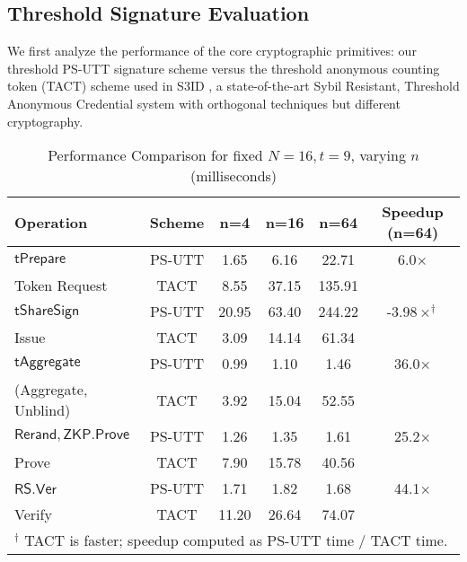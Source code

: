 \subsection{Threshold Signature Evaluation}
We first analyze the performance of the core cryptographic primitives: our threshold PS-UTT signature scheme versus the threshold anonymous counting token (TACT) scheme used in S3ID \cite{rabaninejad_attribute-based_2024}, a state-of-the-art Sybil Resistant, Threshold Anonymous Credential system with orthogonal techniques but different cryptography.

\begin{table}[!htbp]
\centering
\caption[Threshold ABC Performance Comparison, fixed number of nodes, varying attribute length]{Performance Comparison for fixed $ N = 16, t = 9 $, varying $n$ (milliseconds)}
\begin{tabular}{lccccc}
\toprule
\textbf{Operation} & \textbf{Scheme} & \textbf{n=4} & \textbf{n=16} & \textbf{n=64} & \textbf{Speedup (n=64)} \\
\midrule
$\mathsf{tPrepare}$ & PS-UTT & 1.65 & 6.16 & 22.71 & 6.0$\times$ \\
Token Request       & TACT   & 8.55 & 37.15 & 135.91 & \\
\midrule
$\mathsf{tShareSign}$      & PS-UTT & 20.95 & 63.40 & 244.22 & -3.98$\times^\dagger$ \\
Issue             & TACT   & 3.09 & 14.14 & 61.34 & \\
\midrule
$\mathsf{tAggregate}$ & PS-UTT & 0.99 & 1.10 & 1.46 & 36.0$\times$ \\
(Aggregate, Unblind)                     & TACT   & 3.92 & 15.04 & 52.55 & \\
\midrule
$\mathsf{Rerand, ZKP.Prove}$         & PS-UTT & 1.26 & 1.35 & 1.61 & 25.2$\times$ \\
Prove             & TACT   & 7.90 & 15.78 & 40.56 & \\
\midrule
$\mathsf{RS.Ver}$         & PS-UTT & 1.71 & 1.82 & 1.68 & 44.1$\times$ \\
Verify             & TACT   & 11.20 & 26.64 & 74.07 & \\
\bottomrule
\multicolumn{6}{l}{\small $^\dagger$ TACT is faster; speedup computed as PS-UTT time / TACT time.}
\end{tabular}
\label{tab:perf-comp-vary-n}
\end{table}

\vspace{-0.5em}

